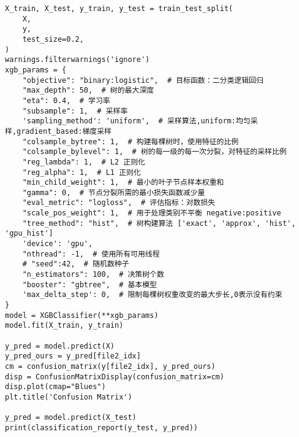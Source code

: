 \begin{lstlisting}
X_train, X_test, y_train, y_test = train_test_split(
    X,
    y,
    test_size=0.2,
)
warnings.filterwarnings('ignore')
xgb_params = {
    "objective": "binary:logistic",  # 目标函数：二分类逻辑回归
    "max_depth": 50,  # 树的最大深度
    "eta": 0.4,  # 学习率
    "subsample": 1,  # 采样率
    'sampling_method': 'uniform',  # 采样算法,uniform:均匀采样,gradient_based:梯度采样
    "colsample_bytree": 1,  # 构建每棵树时，使用特征的比例
    "colsample_bylevel": 1,  # 树的每一级的每一次分裂，对特征的采样比例
    "reg_lambda": 1,  # L2 正则化
    "reg_alpha": 1,  # L1 正则化
    "min_child_weight": 1,  # 最小的叶子节点样本权重和
    "gamma": 0,  # 节点分裂所需的最小损失函数减少量
    "eval_metric": "logloss",  # 评估指标：对数损失
    "scale_pos_weight": 1,  # 用于处理类别不平衡 negative:positive
    "tree_method": "hist",  # 树构建算法 ['exact', 'approx', 'hist', 'gpu_hist']
    'device': 'gpu',
    "nthread": -1,  # 使用所有可用线程
    # "seed":42,  # 随机数种子
    "n_estimators": 100,  # 决策树个数
    "booster": "gbtree",  # 基本模型
    'max_delta_step': 0,  # 限制每棵树权重改变的最大步长,0表示没有约束
}
model = XGBClassifier(**xgb_params)
model.fit(X_train, y_train)

y_pred = model.predict(X)
y_pred_ours = y_pred[file2_idx]
cm = confusion_matrix(y[file2_idx], y_pred_ours)
disp = ConfusionMatrixDisplay(confusion_matrix=cm)
disp.plot(cmap="Blues")
plt.title('Confusion Matrix')

y_pred = model.predict(X_test)
print(classification_report(y_test, y_pred))

\end{lstlisting}